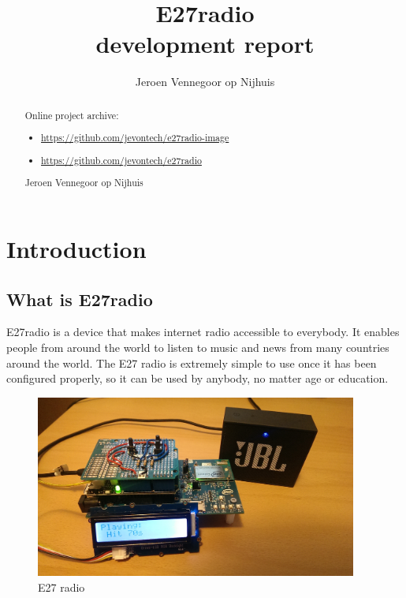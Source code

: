 \documentclass[12pt,a4paper]{scrreprt}
\author{Jeroen Vennegoor op Nijhuis}
\title{E27radio \\ development report}
\begin{document}
\maketitle

\begin{abstract}
Online project archive: 

\begin{itemize}
	\item \url{https://github.com/jevontech/e27radio-image}\\
	\item \url{https://github.com/jevontech/e27radio}\\

\end{itemize}

\begin{center}
 Jeroen Vennegoor op Nijhuis
\end{center}


\end{abstract}

\tableofcontents

\chapter{Introduction}


\section{What is E27radio}
E27radio is a device that makes internet radio accessible to everybody. It enables people from around the world to listen to music and news from many countries around the world. The E27 radio is extremely simple to use once it has been configured properly, so it can be used by anybody, no matter age or education. 
\begin{figure}[h]
	\includegraphics[width=400px]{images/overview}
	\caption{E27 radio}
\end{figure}
\end{document}

